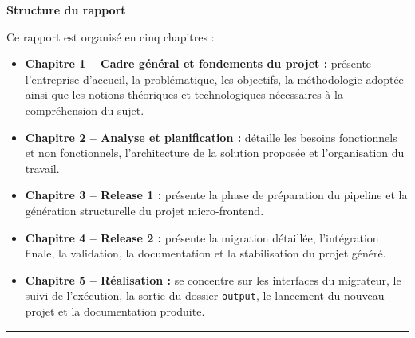\noindent\textbf{Structure du rapport}

\vspace{0.3cm}

\noindent Ce rapport est organisé en cinq chapitres :

\begin{itemize}[leftmargin=1.8cm, itemsep=3pt, topsep=4pt]
    \item \textbf{Chapitre 1 -- Cadre général et fondements du projet :} présente l'entreprise d'accueil, la problématique, les objectifs, la méthodologie adoptée ainsi que les notions théoriques et technologiques nécessaires à la compréhension du sujet.
    \item \textbf{Chapitre 2 -- Analyse et planification :} détaille les besoins fonctionnels et non fonctionnels, l'architecture de la solution proposée et l'organisation du travail.
    \item \textbf{Chapitre 3 -- Release 1 :} présente la phase de préparation du pipeline et la génération structurelle du projet micro-frontend.
    \item \textbf{Chapitre 4 -- Release 2 :} présente la migration détaillée, l'intégration finale, la validation, la documentation et la stabilisation du projet généré.
    \item \textbf{Chapitre 5 -- Réalisation :} se concentre sur les interfaces du migrateur, le suivi de l'exécution, la sortie du dossier \texttt{output}, le lancement du nouveau projet et la documentation produite.
\end{itemize}

\vspace{0.2cm}
\noindent\rule{\linewidth}{1pt}
